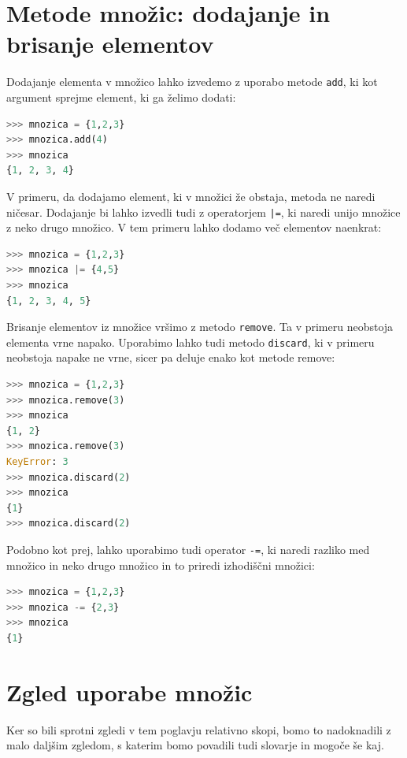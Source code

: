 \section{Metode množic: dodajanje in brisanje elementov}
Dodajanje elementa v množico lahko izvedemo z uporabo metode \texttt{add}, ki kot argument sprejme element, ki ga želimo dodati:
\begin{lstlisting}[language=Python]
>>> mnozica = {1,2,3}
>>> mnozica.add(4)
>>> mnozica
{1, 2, 3, 4}
\end{lstlisting}
V primeru, da dodajamo element, ki v množici že obstaja, metoda ne naredi ničesar. Dodajanje bi lahko izvedli tudi z operatorjem \texttt{|=}, ki naredi unijo množice z neko drugo množico. V tem primeru lahko dodamo več elementov naenkrat:
\begin{lstlisting}[language=Python]
>>> mnozica = {1,2,3}
>>> mnozica |= {4,5}
>>> mnozica
{1, 2, 3, 4, 5}
\end{lstlisting}

Brisanje elementov iz množice vršimo z metodo \texttt{remove}. Ta v primeru neobstoja elementa vrne napako. Uporabimo lahko tudi metodo \texttt{discard}, ki v primeru neobstoja napake ne vrne, sicer pa deluje enako kot metode remove:
\begin{lstlisting}[language=Python]
>>> mnozica = {1,2,3}
>>> mnozica.remove(3)
>>> mnozica
{1, 2}
>>> mnozica.remove(3)
KeyError: 3
>>> mnozica.discard(2)
>>> mnozica
{1}
>>> mnozica.discard(2)
\end{lstlisting}
Podobno kot prej, lahko uporabimo tudi operator \texttt{-=}, ki naredi razliko med množico in neko drugo množico in to priredi izhodiščni množici:
\begin{lstlisting}[language=Python]
>>> mnozica = {1,2,3}
>>> mnozica -= {2,3}
>>> mnozica
{1}
\end{lstlisting}

\section{Zgled uporabe množic}
Ker so bili sprotni zgledi v tem poglavju relativno skopi, bomo to nadoknadili z malo daljšim zgledom, s katerim bomo povadili tudi slovarje in mogoče še kaj. 

